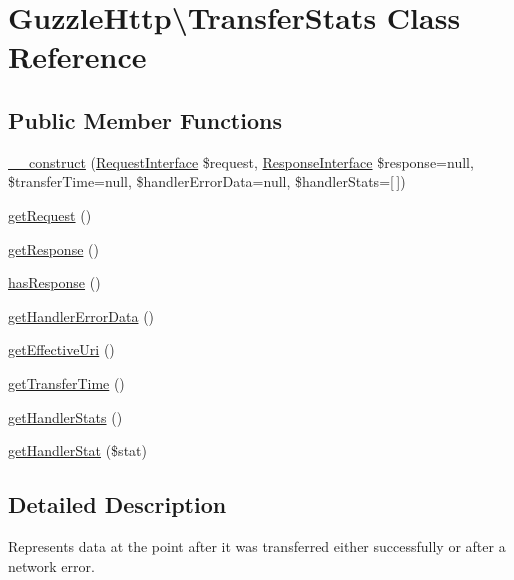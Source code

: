 \hypertarget{classGuzzleHttp_1_1TransferStats}{}\section{Guzzle\+Http\textbackslash{}Transfer\+Stats Class Reference}
\label{classGuzzleHttp_1_1TransferStats}
\subsection*{Public Member Functions}
\begin{DoxyCompactItemize}
\item 
\hyperlink{classGuzzleHttp_1_1TransferStats_af38c1ae27cce9d74f99210868441d90e}{\+\_\+\+\_\+construct} (\hyperlink{interfacePsr_1_1Http_1_1Message_1_1RequestInterface}{Request\+Interface} \$request, \hyperlink{interfacePsr_1_1Http_1_1Message_1_1ResponseInterface}{Response\+Interface} \$response=null, \$transfer\+Time=null, \$handler\+Error\+Data=null, \$handler\+Stats=\mbox{[}$\,$\mbox{]})
\item 
\hyperlink{classGuzzleHttp_1_1TransferStats_a85d61fa677319c2f8ee452028c159640}{get\+Request} ()
\item 
\hyperlink{classGuzzleHttp_1_1TransferStats_a24d462d8c7f1c626b4b0897947ce2acc}{get\+Response} ()
\item 
\hyperlink{classGuzzleHttp_1_1TransferStats_a31b5781cf81cbdec28c5747cae624b1e}{has\+Response} ()
\item 
\hyperlink{classGuzzleHttp_1_1TransferStats_a4c8e144bc31ee3cf663a1cd0f47b3f19}{get\+Handler\+Error\+Data} ()
\item 
\hyperlink{classGuzzleHttp_1_1TransferStats_a7fabc91370f994c5ea8e637c83dde812}{get\+Effective\+Uri} ()
\item 
\hyperlink{classGuzzleHttp_1_1TransferStats_adc88f8894bdbaf833c2dd248d9f236b3}{get\+Transfer\+Time} ()
\item 
\hyperlink{classGuzzleHttp_1_1TransferStats_a9ea5b0da85d20cab4ca13efa036495d2}{get\+Handler\+Stats} ()
\item 
\hyperlink{classGuzzleHttp_1_1TransferStats_af728e7a8e8f3f57889fdf037e1d1b11c}{get\+Handler\+Stat} (\$stat)
\end{DoxyCompactItemize}


\subsection{Detailed Description}
Represents data at the point after it was transferred either successfully or after a network error. 

